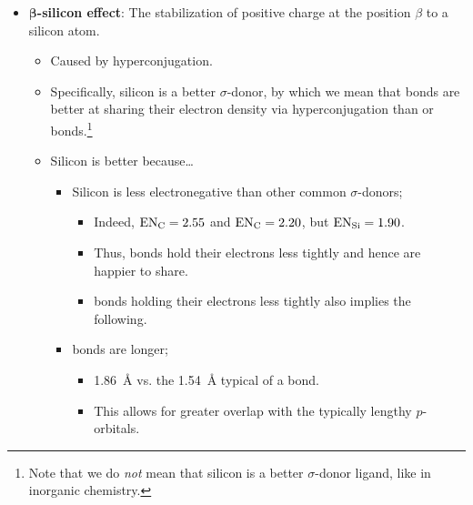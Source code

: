 \documentclass[../notes.tex]{subfiles}
\begin{document}
\begin{itemize}
\begin{itemize}
        \begin{itemize}
            \item The $n_{\ce{O}}$ AO is lower in energy than the $n_{\ce{N}}$ AO.
            \item This means that there is worse energy overlap between the $n_{\ce{O}}$ AO and the $p_{\ce{C}}$ AO than between the $n_{\ce{N}}$ AO and the $p_{\ce{C}}$ AO.
            \item The worse energy overlap with oxygen leads to a resultant decrease in MO splitting, and hence less stabilization for the oxygen lone pair than the nitrogen lone pair receives.
        \end{itemize}
    \end{itemize}
    \item \textbf{$\bm{\beta}$-silicon effect}: The stabilization of positive charge at the position $\beta$ to a silicon atom.
    \begin{itemize}
        \item Caused by hyperconjugation.
        \item Specifically, silicon is a better $\sigma$-donor, by which we mean that  bonds are better at sharing their electron density via hyperconjugation than  or  bonds.\footnote{Note that we do \emph{not} mean that silicon is a better $\sigma$-donor ligand, like in inorganic chemistry.}
        \item Silicon is better because\dots
        \begin{itemize}
            \item Silicon is less electronegative than other common $\sigma$-donors;
            \begin{itemize}
                \item Indeed, $\text{EN}_{\ce{C}}=2.55$ and $\text{EN}_{\ce{C}}=2.20$, but $\text{EN}_{\ce{Si}}=1.90$.
                \item Thus,  bonds hold their electrons less tightly and hence are happier to share.
                \item {} bonds holding their electrons less tightly also implies the following.
            \end{itemize}
            \item {} bonds are longer;
            \begin{itemize}
                \item \SI{1.86}{\angstrom} vs. the \SI{1.54}{\angstrom} typical of a  bond.
                \item This allows for greater overlap with the typically lengthy $p$-orbitals.

\end{itemize}
\end{itemize}
\end{itemize}
\end{itemize}
\end{document}
